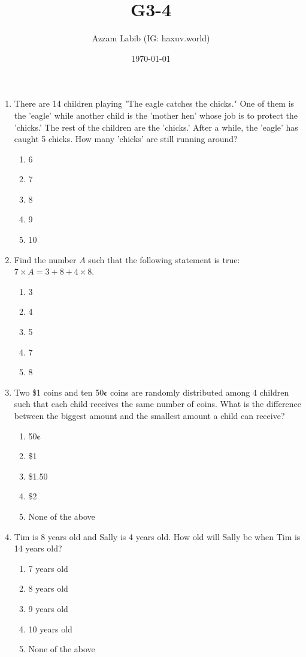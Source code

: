 \documentclass[11pt]{scrartcl}
\title{G3-4}
\author{Azzam Labib (IG: haxuv.world)}
\date{\today}
\begin{document}
\maketitle
\begin{enumerate}
    \item There are 14 children playing "The eagle catches the chicks." One of them is the 'eagle' while another child is the 'mother hen' whose job is to protect the 'chicks.' The rest of the children are the 'chicks.' After a while, the 'eagle' has caught 5 chicks. How many 'chicks' are still running around?
    \begin{enumerate}[label=(\alph*)]
        \item 6
        \item 7
        \item 8
        \item 9
        \item 10
    \end{enumerate}

    \item Find the number \( A \) such that the following statement is true: \( 7 \times A = 3 + 8 + 4 \times 8 \).
    \begin{enumerate}[label=(\alph*)]
        \item 3
        \item 4
        \item 5
        \item 7
        \item 8
    \end{enumerate}

    \item Two \$1 coins and ten 50¢ coins are randomly distributed among 4 children such that each child receives the same number of coins. What is the difference between the biggest amount and the smallest amount a child can receive?
    \begin{enumerate}[label=(\alph*)]
        \item 50¢
        \item \$1
        \item \$1.50
        \item \$2
        \item None of the above
    \end{enumerate}

    \item Tim is 8 years old and Sally is 4 years old. How old will Sally be when Tim is 14 years old?
    \begin{enumerate}[label=(\alph*)]
        \item 7 years old
        \item 8 years old
        \item 9 years old
        \item 10 years old
        \item None of the above
    \end{enumerate}


\end{enumerate}
\end{document}
